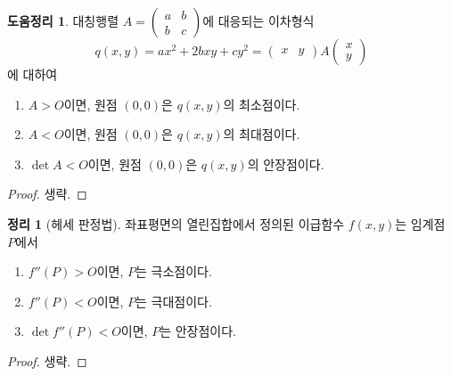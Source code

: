 \documentclass[unfonts,oneside,a4paper]{oblivoir}
\theoremstyle{definition}
\theoremstyle{theorem}
\newtheorem{theorem}{정리}[subsubsection]
\newtheorem{lemma}{도움정리}[subsubsection]
\begin{document}
\begin{lemma}
    대칭행렬 $A = \begin{pmatrix}a & b\\b & c\end{pmatrix}$에 대응되는 이차형식
    \begin{equation*}
        q(x, y) = ax^2 + 2bxy + cy^2 = \begin{pmatrix}x & y\end{pmatrix} A \begin{pmatrix}x\\y\end{pmatrix}
    \end{equation*}
    에 대하여
    \begin{enumerate}
        \item $A > O$이면, 원점 $(0, 0)$은 $q(x, y)$의 최소점이다.
        \item $A < O$이면, 원점 $(0, 0)$은 $q(x, y)$의 최대점이다.
        \item $\det A < O$이면, 원점 $(0, 0)$은 $q(x, y)$의 안장점이다.
    \end{enumerate}
\end{lemma}

\begin{proof}
    생략.
\end{proof}

\begin{theorem}[헤세 판정법]
    좌표평면의 열린집합에서 정의된 이급함수 $f(x, y)$는 임계점 $P$에서
    \begin{enumerate}
        \item $f''(P) > O$이면, $P$는 극소점이다.
        \item $f''(P) < O$이면, $P$는 극대점이다.
        \item $\det f''(P) < O$이면, $P$는 안장점이다.
    \end{enumerate}
\end{theorem}

\begin{proof}
    생략.
\end{proof}
\end{document}

